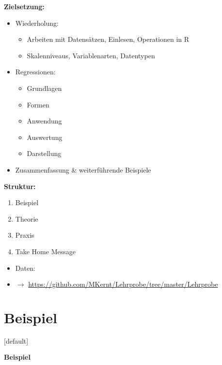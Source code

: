 \documentclass[aspectratio=169, journal, x11names, unknownkeysallowed, hyperref={colorlinks,
linkcolor = SS2,
urlcolor  = F3,
citecolor = F3,
anchorcolor = A4}, 12pt]{beamer}
\newcommand{\oarrow}{\textcolor{A1}{$\rightarrow$} }
\begin{document}
\begin{frame}[t]  
  \begin{minipage}[t]{0.45\textwidth}
    \textbf{\large{Zielsetzung:}}
    \begin{itemize}
      \item Wiederholung: 
      \begin{itemize}
        \item Arbeiten mit Datensätzen, Einlesen, Operationen in R
        \item Skalenniveaus, Variablenarten, Datentypen
      \end{itemize}
      \item Regressionen:
      \begin{itemize}
        \item Grundlagen
        \item Formen
        \item Anwendung
        \item Auswertung
        \item Darstellung
      \end{itemize}
      \item Zusammenfassung \& weiterführende Beispiele
    \end{itemize}
  \end{minipage}%
  \begin{minipage}[t]{0.45\textwidth}
    \textbf{\large{Struktur:}}
    \begin{enumerate}
      \item Beispiel
      \item Theorie
      \item Praxis
      \item Take Home Message
    \end{enumerate}
    \vspace{4em}
    \begin{itemize}
      \item Daten:
      \small
      \item[] \oarrow \url{https://github.com/MKernt/Lehrprobe/tree/master/Lehrprobe}  
    \end{itemize}
  \end{minipage}
\end{frame}

\section{Beispiel}
[default]
\thispagestyle{empty}
\begin{frame} 
\begin{center}
\textcolor{SS2}{\huge{\textbf{Beispiel}}}
\end{center}
\end{frame}
\end{document}
